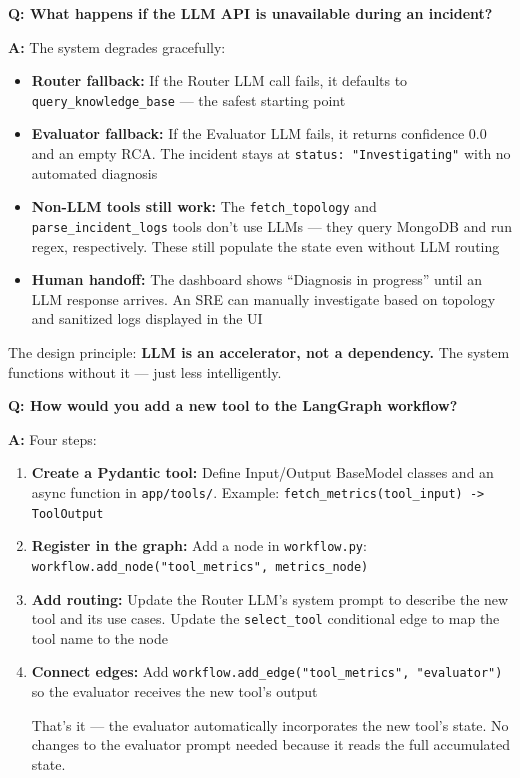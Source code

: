 \documentclass[11pt,a4paper]{article}
\begin{document}
\begin{interviewbox}
\textbf{Q: What happens if the LLM API is unavailable during an incident?}

\textbf{A:} The system degrades gracefully:

\begin{itemize}[leftmargin=*,itemsep=2pt]
  \item \textbf{Router fallback:} If the Router LLM call fails, it defaults to \texttt{query\_knowledge\_base} — the safest starting point
  \item \textbf{Evaluator fallback:} If the Evaluator LLM fails, it returns confidence 0.0 and an empty RCA. The incident stays at \texttt{status: "Investigating"} with no automated diagnosis
  \item \textbf{Non-LLM tools still work:} The \texttt{fetch\_topology} and \texttt{parse\_incident\_logs} tools don't use LLMs — they query MongoDB and run regex, respectively. These still populate the state even without LLM routing
  \item \textbf{Human handoff:} The dashboard shows ``Diagnosis in progress'' until an LLM response arrives. An SRE can manually investigate based on topology and sanitized logs displayed in the UI
\end{itemize}

The design principle: \textbf{LLM is an accelerator, not a dependency.} The system functions without it — just less intelligently.
\end{interviewbox}

\begin{interviewbox}
\textbf{Q: How would you add a new tool to the LangGraph workflow?}

\textbf{A:} Four steps:

\begin{enumerate}[leftmargin=*,itemsep=2pt]
  \item \textbf{Create a Pydantic tool:} Define Input/Output BaseModel classes and an async function in \texttt{app/tools/}. Example: \texttt{fetch\_metrics(tool\_input) -> ToolOutput}
  \item \textbf{Register in the graph:} Add a node in \texttt{workflow.py}: \texttt{workflow.add\_node("tool\_metrics", metrics\_node)}
  \item \textbf{Add routing:} Update the Router LLM's system prompt to describe the new tool and its use cases. Update the \texttt{select\_tool} conditional edge to map the tool name to the node
  \item \textbf{Connect edges:} Add \texttt{workflow.add\_edge("tool\_metrics", "evaluator")} so the evaluator receives the new tool's output

That's it — the evaluator automatically incorporates the new tool's state. No changes to the evaluator prompt needed because it reads the full accumulated state.
\end{enumerate}
\end{interviewbox}
\end{document}
